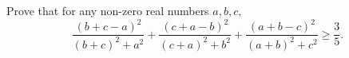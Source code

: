 Prove that for any non-zero real numbers $a, b, c,$
\[\frac{(b+c-a)^2}{(b+c)^2+a^2} + \frac{(c+a-b)^2}{(c+a)^2+b^2} + \frac{(a+b-c)^2}{(a+b)^2+c^2} \geq \frac 35.\]